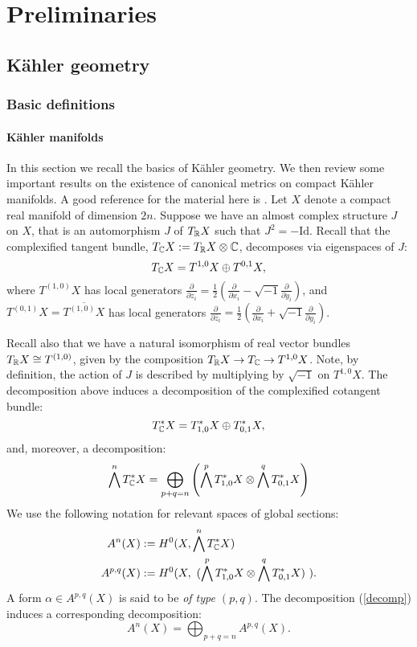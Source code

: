 \chapter{Preliminaries}
\label{chap:prelim}
\section{K\"ahler geometry}
\subsection{Basic definitions}
\subsubsection{K\"ahler manifolds}
In this section we recall the basics of K\"ahler geometry. We then review some important results on the existence of canonical metrics on compact K\"ahler manifolds. A good reference for the material here is \cite{griffiths}. Let \(X\) denote a compact real manifold of dimension \(2n\). Suppose we have an almost complex structure \(J\) on \(X\), that is an automorphism \(J\) of \(T_{\mathbb{R}} X\) such that \(J^2 = - \text{Id}\). Recall that the complexified tangent bundle, \(T_{\mathbb{C}} X := T_{\mathbb{R}} X \otimes \mathbb{C}\), decomposes via eigenspaces of \(J\):
\[
T_{\mathbb{C}} X = T^{1,0} X \oplus T^{0,1} X,
\]
where \(T^{(1,0)} X\) has local generators \(\frac{\partial}{\partial z_i} = \frac{1}{2} \left( \frac{\partial}{\partial x_i}  - \sqrt{-1} \frac{\partial}{\partial y_i}  \right) \), and \(T^{(0,1)} X = \overline{T^{(1,0)} X}\) has local generators \(\frac{\partial}{\partial \bar{z}_i} = \frac{1}{2} \left( \frac{\partial}{\partial x_i}  + \sqrt{-1} \frac{\partial}{\partial y_i}  \right)\).

Recall also that we have a natural isomorphism of real vector bundles \(T_{\mathbb{R}} X \cong T^{(1,0)}\), given by the composition \(T_{\mathbb{R}} X \to T_{\mathbb{C}} \to T^{1,0}X\). Note, by definition, the action of \(J\) is described by multiplying by \(\sqrt{-1}\) on \(T^{1,0} X\). The decomposition above induces a decomposition of the complexified cotangent bundle:
\[
T^*_{\mathbb{C}} X = T^*_{1,0} X \oplus T^*_{0,1} X,
\]
and, moreover, a decomposition:
\begin{equation} \label{decomp}
\bigwedge^n T^*_{\mathbb{C}} X = \bigoplus_{p+q = n} \left(\bigwedge^p T^*_{1,0} X \otimes \bigwedge^q T^*_{0,1} X   \right)
\end{equation}
We use the following notation for relevant spaces of global sections:
\begin{align}
A^n(X) &:= H^0(X,\bigwedge^n T^*_{\mathbb{C}} X) \\
A^{p,q}(X) &:= H^0 ( X, \ (\bigwedge^p T^*_{1,0} X \otimes \bigwedge^q T^*_{0,1} X   ) \ ).
\end{align}
A form \(\alpha \in A^{p,q}(X)\) is said to be \textit{of type \((p,q)\)}. The decomposition (\ref{decomp}) induces a corresponding decomposition:
\[
A^n(X) = \bigoplus_{p+q = n} A^{p,q}(X).
\]

